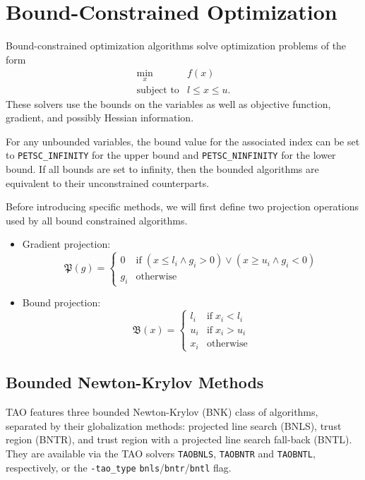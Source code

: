 \section{Bound-Constrained Optimization}
\label{chapter:bound}

Bound-constrained optimization algorithms solve optimization problems of the form
\[
\begin{array}{ll} \displaystyle
\min_{x} & f(x) \\
\mbox{subject to} & l \leq x \leq u.
\end{array}
\]
These solvers use the bounds on the variables as well as objective
function, gradient, and possibly Hessian information.

For any unbounded variables, the bound value for the associated index can be set 
to {\tt PETSC\_INFINITY} for the upper bound and {\tt PETSC\_NINFINITY} for the lower 
bound. If all bounds are set to infinity, then the bounded algorithms are equivalent 
to their unconstrained counterparts.

Before introducing specific methods, we will first define two projection operations 
used by all bound constrained algorithms.
\begin{itemize}
\item Gradient projection:
\[
\mathfrak{P}(g) = \left\{\begin{array}{ll}
0 & \mbox{if} \; (x \leq l_i \land g_i > 0) \lor (x \geq u_i \land g_i < 0) \\
g_i & \mbox{otherwise}
\end{array}
\right.
\]
\item Bound projection:
\[
\mathfrak{B}(x) = \left\{\begin{array}{ll}
l_i & \mbox{if} \; x_i < l_i \\
u_i & \mbox{if} \; x_i > u_i \\
x_i & \mbox{otherwise}
\end{array}
\right.
\]
\end{itemize}

\subsection{Bounded Newton-Krylov Methods}\label{sec:bnk}

TAO features three bounded Newton-Krylov (BNK) class of algorithms, separated by their 
globalization methods: projected line search (BNLS), trust region (BNTR), and trust region 
with a projected line search fall-back (BNTL). They are available via the TAO 
solvers {\tt TAOBNLS}, {\tt TAOBNTR} and {\tt TAOBNTL}, respectively, or the 
{\tt -tao\_type} {\tt bnls}/{\tt bntr}/{\tt bntl} flag.

